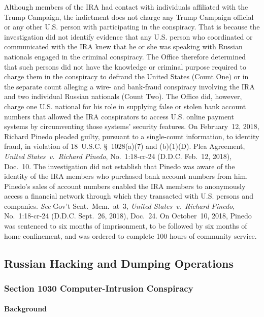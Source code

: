 Although members of the IRA had contact with individuals affiliated with the Trump Campaign, the indictment does not charge any Trump Campaign official or any other U.S. person with participating in the conspiracy.
That is because the investigation did not identify evidence that any U.S. person who coordinated or communicated with the IRA knew that he or she was speaking with Russian nationals engaged in the criminal conspiracy.
The Office therefore determined that such persons did not have the knowledge or criminal purpose required to charge them in the conspiracy to defraud the United States (Count One) or in the separate count alleging a wire- and bank-fraud conspiracy involving the IRA and two individual Russian nationals (Count Two).
The Office did, however, charge one U.S. national for his role in supplying false or stolen bank account numbers that allowed the IRA conspirators to access U.S. online payment systems by circumventing those systems' security features.
On February~12, 2018, Richard Pinedo pleaded guilty, pursuant to a single-count information, to identity fraud, in violation of 18~U.S.C. \S~1028(a)(7) and (b)(1)(D).
Plea Agreement, \textit{United States~v.\ Richard Pinedo}, No.~1:18-cr-24 (D.D.C. Feb.~12, 2018), Doc.~10.
The investigation did not establish that Pinedo was aware of the identity of the IRA members who purchased bank account numbers from him.
Pinedo's sales of account numbers enabled the IRA members to anonymously access a financial network through which they transacted with U.S. persons and companies.
\textit{See} Gov't Sent.~Mem.~at~3, \textit{United States~v.\ Richard Pinedo}, No.~1:18-cr-24 (D.D.C. Sept.~26, 2018), Doc.~24.
On October~10, 2018, Pinedo was sentenced to six months of imprisonment, to be followed by six months of home confinement, and was ordered to complete 100 hours of community service.

\subsection{Russian Hacking and Dumping Operations}

\subsubsection{Section 1030 Computer-Intrusion Conspiracy}

\paragraph{Background}


